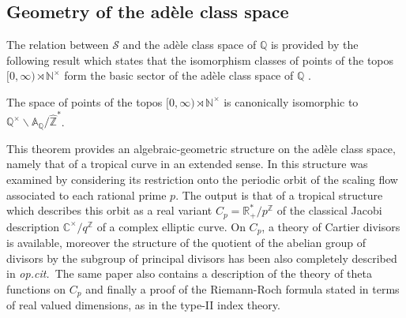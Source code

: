 \documentclass[graybox, envcountsect%
]{svmult}
\def\A{{\mathbb A}}
\def\C{{\mathbb C}}
\def\N{{\mathbb N}}
\def\Q{{\mathbb Q}}
\def\R{{\mathbb R}}
\def\Z{{\mathbb Z}}
\def\aarith{{\mathfrak A}}
\def\cO{{\mathcal O}}
\def\scal{{(\rnt,\cO)}}
\newcommand{\opcit}{{\it op.cit.\/}\ }
\def\no{\noindent}
\def\rnt{{[0,\infty)\rtimes{\N^{\times}}}}
\def\aarith{{\mathscr A}}
\def\scal{{(\rnt,\cO)}}
\def\scal1{{\hat \aarith}}
\def\scal2{{\mathscr S}}
\begin{document}
 
 \subsection{Geometry of the ad\`ele class space}\label{subsec:2.3}
 
The relation between $\scal2$ and the ad\`ele class space of $\Q$ is provided 
by the following result which states that the isomorphism classes of points  of the topos $\rnt$ form the basic sector of the ad\`ele class space of $\Q$ \cite{CC4}.

\begin{theorem}\label{scaltopintro}The  space of  points of the topos $\rnt$
is canonically isomorphic to $\Q^\times\backslash\A_\Q/\hat\Z^*$.
\end{theorem}

\no This theorem provides an algebraic-geometric structure on the ad\`ele class space, namely that of a tropical curve in an extended sense. In \cite{CC4} this structure was examined by considering its restriction  onto the periodic orbit of the scaling flow associated to each rational prime $p$. The output is that of  a tropical structure which describes this orbit as a real variant $C_p=\R_+^*/p^\Z$ of the classical Jacobi description $\C^\times/q^\Z$ of a complex elliptic curve. On $C_p$, a theory of Cartier divisors is available, moreover the structure of the quotient  of the abelian group of divisors by the subgroup of principal divisors has been also completely described in \opcit The same paper also contains a description of the theory of theta functions on $C_p$ and finally a proof of the Riemann-Roch formula stated in terms of real valued dimensions, as in the type-II index theory.
\end{document}
